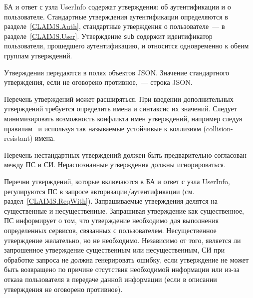 \label{CLAIMS.General}

БА и ответ с узла UserInfo содержат утверждения: об аутентификации и о 
пользователе. Стандартные утверждения аутентификации определяются в 
разделе~\ref{CLAIMS.Auth}, стандартные утверждения о пользователе~--- 
в разделе~\ref{CLAIMS.User}. 
%
Утверждение \lstinline{sub} содержит идентификатор пользователя, прошедшего 
аутентификацию, и относится одновременно к обеим группам утверждений.

Утверждения передаются в полях объектов JSON. Значение стандартного 
утверждения, если не оговорено противное,~--- строка JSON.

Перечень утверждений может расширяться. При введении дополнительных утверждений 
требуется определить имена и синтаксис их значений. 
%
Следует минимизировать возможность конфликта имен утверждений, например 
следуя правилам~\cite{RFC7519} и используя так называемые 
устойчивые к коллизиям (collision-resistant) имена. 

Перечень нестандартных утверждений должен быть предварительно согласован между
ПС и СИ. Нераспознанные утверждения должны игнорироваться.

Перечни утверждений, которые включаются в БА и ответ с узла UserInfo, 
регулируются ПС в запросе авторизации/аутентификации (см. раздел~\ref{CLAIMS.ReqWith}).
%
Запрашиваемые утверждения делятся на существенные и несущественные.
%
Запрашивая утверждение как существенное, ПС информирует о том, что 
утверждение необходимо для выполнения определенных сервисов, связанных с 
пользователем.
%
Несущественное утверждение желательно, но не необходимо.
%
Независимо от того, является ли запрошенное утверждение существенным или 
несущественным, СИ при обработке запроса не должна генерировать ошибку, если 
утверждение не может быть возвращено по причине отсутствия необходимой 
информации или из-за отказа пользователя в передаче данной информации 
(если в описании утверждения не оговорено противное).

